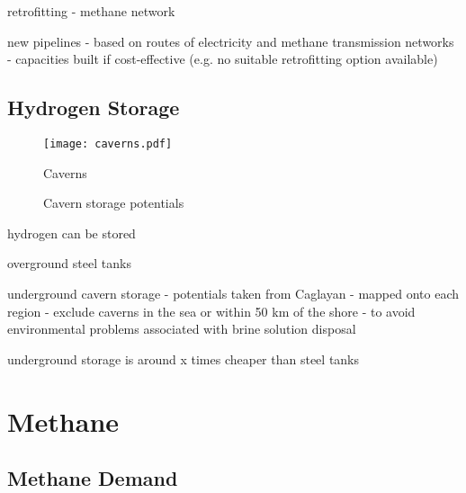retrofitting
- methane network

new pipelines
- based on routes of electricity and methane transmission networks
- capacities built if cost-effective (e.g. no suitable retrofitting option available)

\subsection{Hydrogen Storage}

\begin{SCfigure}
    \centering
    \texttt{[image: caverns.pdf]}
    \label{fig:caverns}
    \caption{Caverns}
\end{SCfigure}

\begin{figure}
    \centering
    \caption{Cavern storage potentials}
    \label{fig:clustered-caverns}
\end{figure}

hydrogen can be stored

overground steel tanks

underground cavern storage
- potentials taken from Caglayan
- mapped onto each region
- exclude caverns in the sea or within 50 km of the shore
- to avoid environmental problems associated with brine solution disposal


underground storage is around x times cheaper than steel tanks

\section{Methane}

\subsection{Methane Demand}

